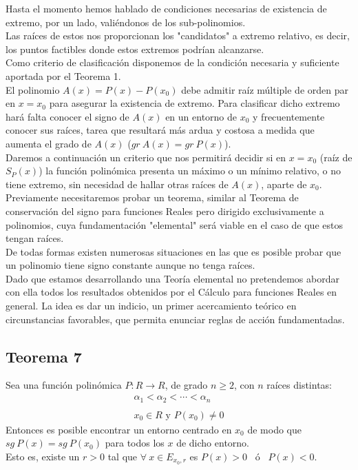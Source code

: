 \documentclass[12pt]{article}
\begin{document}
Hasta el momento hemos hablado de condiciones necesarias de existencia de extremo, por un lado, valiéndonos de los sub-polinomios.\\
Las raíces de estos nos proporcionan los "candidatos" a extremo relativo, es decir, los puntos factibles donde estos extremos podrían alcanzarse.\\
Como criterio de clasificación disponemos de la condición necesaria y suficiente aportada por el Teorema 1.\\
El polinomio $A(x)=P(x)-P({x}_0)$ debe admitir raíz múltiple de orden par en $x={x}_0$ para asegurar la existencia de extremo. Para clasificar dicho extremo hará falta conocer el signo de $A(x)$ en un entorno de ${x}_0$ y frecuentemente conocer sus raíces, tarea que resultará más ardua y costosa a medida que aumenta el grado de $A(x)$ ($gr \ A(x)=gr \ P(x)$).\\
Daremos a continuación un criterio que nos permitirá decidir si en $x={x}_0$ (raíz de ${S}_P(x)$) la función polinómica presenta un máximo o un mínimo relativo, o no tiene extremo, sin necesidad de hallar otras raíces de $A(x)$, aparte de ${x}_0$.\\
Previamente necesitaremos probar un teorema, similar al Teorema de conservación del signo para funciones Reales pero dirigido exclusivamente a polinomios, cuya fundamentación "elemental" será viable en el caso de que estos tengan raíces.\\
De todas formas existen numerosas situaciones en las que es posible probar que un polinomio tiene signo constante aunque no tenga raíces.\\
Dado que estamos desarrollando una Teoría elemental no pretendemos abordar con ella todos los resultados obtenidos por el Cálculo para funciones Reales en general. La idea es dar un indicio, un primer acercamiento teórico en circunstancias favorables, que permita enunciar reglas de acción fundamentadas.
\clearpage

\subsection{
  Teorema 7
}
Sea una función polinómica $P:R \rightarrow R$, de grado $n \geqslant 2$, con $n$ raíces distintas:
$$
  \begin{array}{ccc}
    {\alpha}_1 < {\alpha}_2 < \cdots < {\alpha}_n \\
    \\
    {x}_0 \in R \text{ \ y \ } P({x}_0) \neq 0
  \end{array}
$$
Entonces es posible encontrar un entorno centrado en ${x}_0$ de modo que $sg \ P(x)=sg \ P({x}_0)$ para todos los $x$ de dicho entorno.\\
Esto es, existe un $r > 0$ tal que $\forall \ x \in {E}_{{x}_0, r}$ es $P(x)>0$ \ ó \ $P(x)<0$.
\end{document}
